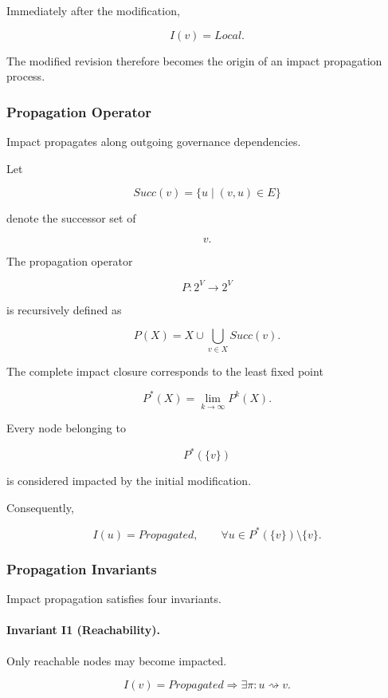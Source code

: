 \documentclass[10pt]{article}
\begin{document}
Immediately after the modification,

\[
I(v)=Local.
\]

The modified revision therefore becomes the origin of an impact propagation
process.

\subsubsection{Propagation Operator}

Impact propagates along outgoing governance dependencies.

Let

\[
Succ(v)
=
\{
u
\mid
(v,u)\in E
\}
\]

denote the successor set of

\[
v.
\]

The propagation operator

\[
P
:
2^V
\rightarrow
2^V
\]

is recursively defined as

\[
P(X)
=
X
\cup
\bigcup_{v\in X}
Succ(v).
\]

The complete impact closure corresponds to the least fixed point

\[
P^\ast(X)
=
\lim_{k\rightarrow\infty}
P^{k}(X).
\]

Every node belonging to

\[
P^\ast(\{v\})
\]

is considered impacted by the initial modification.

Consequently,

\[
I(u)=Propagated,
\qquad
\forall
u
\in
P^\ast(\{v\})
\setminus
\{v\}.
\]

\subsubsection{Propagation Invariants}

Impact propagation satisfies four invariants.

\paragraph{Invariant I1 (Reachability).}

Only reachable nodes may become impacted.

\[
I(v)=Propagated
\Longrightarrow
\exists
\pi
:
u
\rightsquigarrow
v.
\]
\end{document}
